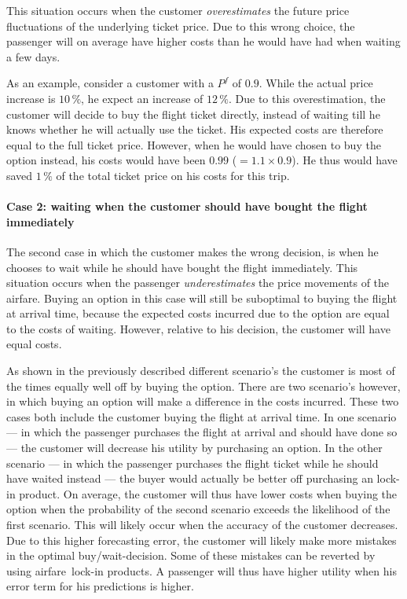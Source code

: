This situation occurs when the customer \emph{overestimates} the future price fluctuations of the underlying ticket price. Due to this wrong choice, the passenger will on average have higher costs than he would have had when waiting a few days.

As an example, consider a customer with a $P^f$ of $0.9$. While the actual price increase is $10\,\%$, he expect an increase of $12\,\%$. Due to this overestimation, the customer will decide to buy the flight ticket directly, instead of waiting till he knows whether he will actually use the ticket. His expected costs are therefore equal to the full ticket price. However, when he would have chosen to buy the option instead, his costs would have been $0.99$ ($= 1.1 \times 0.9$). He thus would have saved $1\,\%$ of the total ticket price on his costs for this trip.

\paragraph{Case 2: waiting when the customer should have bought the flight immediately}

The second case in which the customer makes the wrong decision, is when he chooses to wait while he should have bought the flight immediately. This situation occurs when the passenger \emph{underestimates} the price movements of the airfare. Buying an option in this case will still be suboptimal to buying the flight at arrival time, because the expected costs incurred due to the option are equal to the costs of waiting. However, relative to his decision, the customer will have equal costs.

As shown in the previously described different scenario's the customer is most of the times equally well off by buying the option. There are two scenario's however, in which buying an option will make a difference in the costs incurred. These two cases both include the customer buying the flight at arrival time. In one scenario --- in which the passenger purchases the flight at arrival and should have done so --- the customer will decrease his utility by purchasing an option. In the other scenario --- in which the passenger purchases the flight ticket while he should have waited instead --- the buyer would actually be better off purchasing an lock-in product. On average, the customer will thus have lower costs when buying the option when the probability of the second scenario exceeds the likelihood of the first scenario. This will likely occur when the accuracy of the customer decreases. Due to this higher forecasting error, the customer will likely make more mistakes in the optimal buy/wait-decision. Some of these mistakes can be reverted by using airfare~lock-in products. A passenger will thus have higher utility when his error term for his predictions is higher.


